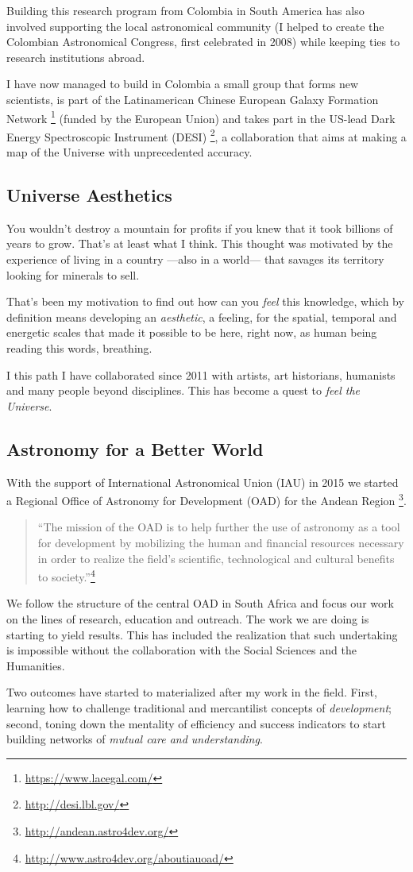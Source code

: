 \documentclass[a4paper,10pt]{article} %
\begin{document}
Building this research program from Colombia in South America has also
involved supporting the local astronomical community (I helped to
create the Colombian Astronomical Congress, first celebrated in 2008)
while keeping ties to research institutions abroad.

I have now managed to build in Colombia a small group that forms new
scientists, is part of the Latinamerican Chinese European Galaxy Formation
Network \footnote{\url{https://www.lacegal.com/}} (funded by the
European Union)  and takes part in the US-lead Dark Energy Spectroscopic Instrument
(DESI) \footnote{\url{http://desi.lbl.gov/}}, a collaboration that
aims at making a map of the Universe with unprecedented accuracy. 


\subsection{Universe Aesthetics}

You wouldn't destroy a mountain for profits if you knew that
it took billions of years to grow. That's at least what I think. This
thought was motivated by the experience of living in a country ---also
in a world--- that savages its territory looking for minerals to
sell. 

That's been my motivation to find out how can you \emph{feel} this knowledge,
which by definition means developing an \emph{aesthetic}, a feeling,
for the spatial, temporal and energetic scales that made it possible
to be here, right now, as human being reading this words, breathing.

I this path I have collaborated since 2011 with artists, art historians,
humanists and many people beyond disciplines.
This has become a quest to \emph{feel the Universe}.

\subsection{Astronomy for a Better World}

With the support of International Astronomical Union (IAU)
in 2015 we started a Regional Office of Astronomy for
Development (OAD) for the Andean Region \footnote{\url{http://andean.astro4dev.org/}}.
\begin{quote}
``The mission of the OAD is to help further the use of astronomy as a
tool for development by mobilizing the human and financial resources
necessary in order to realize the field’s scientific, technological
and cultural benefits to society.''\footnote{\url{http://www.astro4dev.org/aboutiauoad/}} 
\end{quote}
We follow the structure of the central OAD in South Africa and focus
our work on the lines of research, education and outreach. 
The work we are doing is starting to yield results. 
This has included the realization that such undertaking is impossible
without the collaboration with the Social Sciences and the Humanities.

Two outcomes have started to materialized after my work in the field.
First, learning how to challenge traditional and mercantilist concepts of
\emph{development}; second, toning down the mentality of efficiency and
success indicators to start building networks of \emph{mutual care and
understanding}.  
\end{document}
